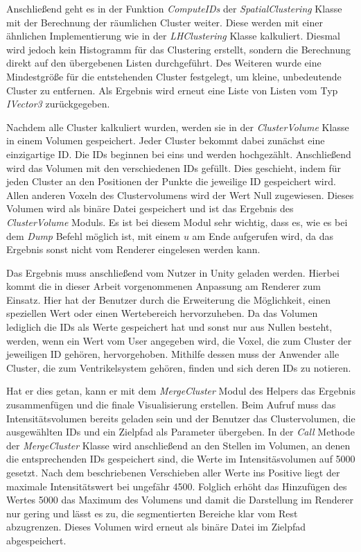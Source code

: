 Anschließend geht es in der Funktion \textit{ComputeIDs} der \textit{SpatialClustering} Klasse mit der Berechnung der räumlichen Cluster weiter. Diese werden mit einer ähnlichen Implementierung wie in der \textit{LHClustering} Klasse kalkuliert. Diesmal wird jedoch kein Histogramm für das Clustering erstellt, sondern die Berechnung direkt auf den übergebenen Listen durchgeführt. Des Weiteren wurde eine Mindestgröße für die entstehenden Cluster festgelegt, um kleine, unbedeutende Cluster zu entfernen. Als Ergebnis wird erneut eine Liste von Listen vom Typ \textit{IVector3} zurückgegeben.


Nachdem alle Cluster kalkuliert wurden, werden sie in der \textit{ClusterVolume} Klasse in einem Volumen gespeichert. Jeder Cluster bekommt dabei zunächst eine einzigartige ID. Die IDs beginnen bei eins und werden hochgezählt. Anschließend wird das Volumen mit den verschiedenen IDs gefüllt. Dies geschieht, indem für jeden Cluster an den Positionen der Punkte die jeweilige ID gespeichert wird. Allen anderen Voxeln des Clustervolumens wird der Wert Null zugewiesen.
Dieses Volumen wird als binäre Datei gespeichert und ist das Ergebnis des \textit{ClusterVolume} Moduls. Es ist bei diesem Modul sehr wichtig, dass es, wie es bei dem \textit{Dump} Befehl möglich ist, mit einem $u$ am Ende aufgerufen wird, da das Ergebnis sonst nicht vom Renderer eingelesen werden kann.


Das Ergebnis muss anschließend vom Nutzer in Unity geladen werden. Hierbei kommt die in dieser Arbeit vorgenommenen Anpassung am Renderer zum Einsatz.
Hier hat der Benutzer durch die Erweiterung die Möglichkeit, einen speziellen Wert oder einen Wertebereich hervorzuheben. Da das Volumen lediglich die IDs als Werte gespeichert hat und sonst nur aus Nullen besteht, werden, wenn ein Wert vom User angegeben wird, die Voxel, die zum Cluster der jeweiligen ID gehören, hervorgehoben.
Mithilfe dessen muss der Anwender alle Cluster, die zum Ventrikelsystem gehören, finden und sich deren IDs zu notieren.


Hat er dies getan, kann er mit dem \textit{MergeCluster} Modul des Helpers das Ergebnis zusammenfügen und die finale Visualisierung erstellen. Beim Aufruf muss das Intensitätsvolumen bereits geladen sein und der Benutzer das Clustervolumen, die ausgewählten IDs und ein Zielpfad als Parameter übergeben. In der \textit{Call} Methode der \textit{MergeCluster} Klasse wird anschließend an den Stellen im Volumen, an denen die entsprechenden IDs gespeichert sind, die Werte im Intensitäsvolumen auf 5000 gesetzt.
Nach dem beschriebenen Verschieben aller Werte ins Positive liegt der maximale Intensitätswert bei ungefähr 4500. Folglich erhöht das Hinzufügen des Wertes 5000 das Maximum des Volumens und damit die Darstellung im Renderer nur gering und lässt es zu, die segmentierten Bereiche klar vom Rest abzugrenzen. Dieses Volumen wird erneut als binäre Datei im Zielpfad abgespeichert.


